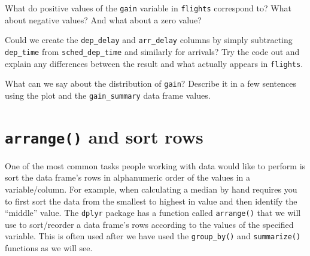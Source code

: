 \documentclass[
  letterpaper,
  DIV=11,
  numbers=noendperiod]{scrreprt}
\theoremstyle{definition}
\theoremstyle{remark}
\begin{document}
\begin{tcolorbox}[enhanced jigsaw, coltitle=black, toprule=.15mm, bottomtitle=1mm, breakable, leftrule=.75mm, title={{🎯} Learning Check 3.11}, opacitybacktitle=0.6, colback=white, rightrule=.15mm, opacityback=0, toptitle=1mm, colbacktitle=quarto-callout-tip-color!10!white, colframe=quarto-callout-tip-color-frame, titlerule=0mm, arc=.35mm, bottomrule=.15mm, left=2mm]
What do positive values of the \texttt{gain} variable in
\texttt{flights} correspond to? What about negative values? And what
about a zero value?
\end{tcolorbox}

\begin{tcolorbox}[enhanced jigsaw, coltitle=black, toprule=.15mm, bottomtitle=1mm, breakable, leftrule=.75mm, title={{🎯} Learning Check 3.12}, opacitybacktitle=0.6, colback=white, rightrule=.15mm, opacityback=0, toptitle=1mm, colbacktitle=quarto-callout-tip-color!10!white, colframe=quarto-callout-tip-color-frame, titlerule=0mm, arc=.35mm, bottomrule=.15mm, left=2mm]
Could we create the \texttt{dep\_delay} and \texttt{arr\_delay} columns
by simply subtracting \texttt{dep\_time} from \texttt{sched\_dep\_time}
and similarly for arrivals? Try the code out and explain any differences
between the result and what actually appears in \texttt{flights}.
\end{tcolorbox}

\begin{tcolorbox}[enhanced jigsaw, coltitle=black, toprule=.15mm, bottomtitle=1mm, breakable, leftrule=.75mm, title={{🎯} Learning Check 3.13}, opacitybacktitle=0.6, colback=white, rightrule=.15mm, opacityback=0, toptitle=1mm, colbacktitle=quarto-callout-tip-color!10!white, colframe=quarto-callout-tip-color-frame, titlerule=0mm, arc=.35mm, bottomrule=.15mm, left=2mm]
What can we say about the distribution of \texttt{gain}? Describe it in
a few sentences using the plot and the \texttt{gain\_summary} data frame
values.
\end{tcolorbox}

\hypertarget{sec-arrange}{%
\section{\texorpdfstring{\texttt{arrange()} and sort
rows}{arrange() and sort rows}}\label{sec-arrange}}

One of the most common tasks people working with data would like to
perform is sort the data frame's rows in alphanumeric order of the
values in a variable/column. For example, when calculating a median by
hand requires you to first sort the data from the smallest to highest in
value and then identify the ``middle'' value. The \texttt{dplyr} package
has a function called \texttt{arrange()} that we will use to
sort/reorder a data frame's rows according to the values of the
specified variable. This is often used after we have used the
\texttt{group\_by()} and \texttt{summarize()} functions as we will see.
\end{document}
